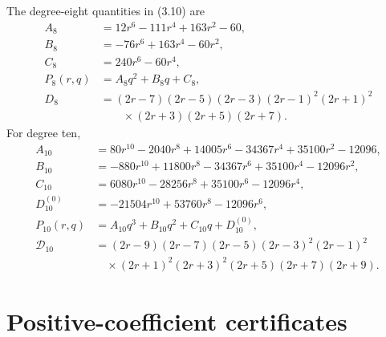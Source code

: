 \documentclass[11pt]{article}
\newcommand{\cD}{\mathcal D}
\begin{document}
The degree-eight quantities in (3.10) are
\begin{align*}
A_8&=12r^6-111r^4+163r^2-60,\\
B_8&=-76r^6+163r^4-60r^2,\\
C_8&=240r^6-60r^4,\\
P_8(r,q)&=A_8q^2+B_8q+C_8,\\
D_8&=(2r-7)(2r-5)(2r-3)(2r-1)^2(2r+1)^2\\
&\qquad\times(2r+3)(2r+5)(2r+7).
\end{align*}
For degree ten,
\begin{align*}
A_{10}&=80r^{10}-2040r^8+14005r^6-34367r^4+35100r^2-12096,\\
B_{10}&=-880r^{10}+11800r^8-34367r^6+35100r^4-12096r^2,\\
C_{10}&=6080r^{10}-28256r^8+35100r^6-12096r^4,\\
D_{10}^{(0)}&=-21504r^{10}+53760r^8-12096r^6,\\
P_{10}(r,q)&=A_{10}q^3+B_{10}q^2+C_{10}q+D_{10}^{(0)},\\
\cD_{10}&=(2r-9)(2r-7)(2r-5)(2r-3)^2(2r-1)^2\\
&\quad\times(2r+1)^2(2r+3)^2(2r+5)(2r+7)(2r+9).
\end{align*}

\section{Positive-coefficient certificates}\label{app:positive}
\end{document}

